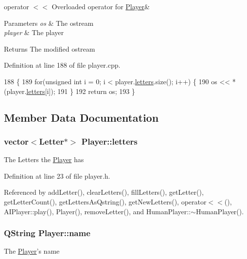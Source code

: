 operator $<$$<$ Overloaded operator for \hyperlink{class_player}{Player}\& 


\begin{DoxyParams}{Parameters}
{\em os} & The ostream \\
\hline
{\em player} & The player \\
\hline
\end{DoxyParams}
\begin{DoxyReturn}{Returns}
The modified ostream 
\end{DoxyReturn}


Definition at line 188 of file player.\-cpp.


\begin{DoxyCode}
188                                                        \{
189     \textcolor{keywordflow}{for}(\textcolor{keywordtype}{unsigned} \textcolor{keywordtype}{int} i = 0; i < player.\hyperlink{class_player_abd40dc8f6d524bd1331a8133e9bb8902}{letters}.size(); i++) \{
190         os << *(player.\hyperlink{class_player_abd40dc8f6d524bd1331a8133e9bb8902}{letters}[i]);
191     \}
192     \textcolor{keywordflow}{return} os;
193 \}
\end{DoxyCode}


\subsection{Member Data Documentation}
\hypertarget{class_player_abd40dc8f6d524bd1331a8133e9bb8902}{
\subsubsection[{letters}]{\setlength{\rightskip}{0pt plus 5cm}vector$<${\bf Letter}$\ast$$>$ Player\-::letters\hspace{0.3cm}{\ttfamily [protected]}}}\label{class_player_abd40dc8f6d524bd1331a8133e9bb8902}
The Letters the \hyperlink{class_player}{Player} has 

Definition at line 23 of file player.\-h.



Referenced by add\-Letter(), clear\-Letters(), fill\-Letters(), get\-Letter(), get\-Letter\-Count(), get\-Letters\-As\-Qstring(), get\-New\-Letters(), operator$<$$<$(), A\-I\-Player\-::play(), Player(), remove\-Letter(), and Human\-Player\-::$\sim$\-Human\-Player().

\hypertarget{class_player_ac41b72814d9c41222dac999bc874280b}{
\subsubsection[{name}]{\setlength{\rightskip}{0pt plus 5cm}Q\-String Player\-::name\hspace{0.3cm}{\ttfamily [protected]}}}\label{class_player_ac41b72814d9c41222dac999bc874280b}
The \hyperlink{class_player}{Player}'s name 

